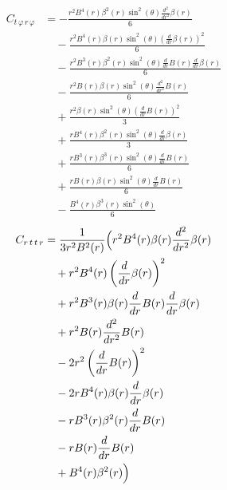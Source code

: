 \documentclass[11pt,a4paper]{article}
\begin{document}
\begin{align*}
  C_{t\,\varphi\,r\,\varphi} &= - \frac{r^{2} B^{4}{\left(r \right)} \beta^{2}{\left(r \right)} \sin^{2}{\left(\theta \right)} \frac{d^{2}}{d r^{2}} \beta{\left(r \right)}}{6} \\
  &\quad - \frac{r^{2} B^{4}{\left(r \right)} \beta{\left(r \right)} \sin^{2}{\left(\theta \right)} \left(\frac{d}{d r} \beta{\left(r \right)}\right)^{2}}{6} \\
  &\quad - \frac{r^{2} B^{3}{\left(r \right)} \beta^{2}{\left(r \right)} \sin^{2}{\left(\theta \right)} \frac{d}{d r} B{\left(r \right)} \frac{d}{d r} \beta{\left(r \right)}}{6} \\
  &\quad - \frac{r^{2} B{\left(r \right)} \beta{\left(r \right)} \sin^{2}{\left(\theta \right)} \frac{d^{2}}{d r^{2}} B{\left(r \right)}}{6} \\
  &\quad + \frac{r^{2} \beta{\left(r \right)} \sin^{2}{\left(\theta \right)} \left(\frac{d}{d r} B{\left(r \right)}\right)^{2}}{3} \\
  &\quad + \frac{r B^{4}{\left(r \right)} \beta^{2}{\left(r \right)} \sin^{2}{\left(\theta \right)} \frac{d}{d r} \beta{\left(r \right)}}{3} \\
  &\quad + \frac{r B^{3}{\left(r \right)} \beta^{3}{\left(r \right)} \sin^{2}{\left(\theta \right)} \frac{d}{d r} B{\left(r \right)}}{6} \\
  &\quad + \frac{r B{\left(r \right)} \beta{\left(r \right)} \sin^{2}{\left(\theta \right)} \frac{d}{d r} B{\left(r \right)}}{6} \\
  &\quad - \frac{B^{4}{\left(r \right)} \beta^{3}{\left(r \right)} \sin^{2}{\left(\theta \right)}}{6}
\end{align*}
\begin{align*}
  C_{r\,t\,t\,r} &= \frac{1}{3 r^{2} B^{2}{\left(r \right)}}\Bigl(r^{2} B^{4}{\left(r \right)} \beta{\left(r \right)} \frac{d^{2}}{d r^{2}} \beta{\left(r \right)} \\
  &\quad + r^{2} B^{4}{\left(r \right)} \left(\frac{d}{d r} \beta{\left(r \right)}\right)^{2} \\
  &\quad + r^{2} B^{3}{\left(r \right)} \beta{\left(r \right)} \frac{d}{d r} B{\left(r \right)} \frac{d}{d r} \beta{\left(r \right)} \\
  &\quad + r^{2} B{\left(r \right)} \frac{d^{2}}{d r^{2}} B{\left(r \right)} \\
  &\quad - 2 r^{2} \left(\frac{d}{d r} B{\left(r \right)}\right)^{2} \\
  &\quad - 2 r B^{4}{\left(r \right)} \beta{\left(r \right)} \frac{d}{d r} \beta{\left(r \right)} \\
  &\quad - r B^{3}{\left(r \right)} \beta^{2}{\left(r \right)} \frac{d}{d r} B{\left(r \right)} \\
  &\quad - r B{\left(r \right)} \frac{d}{d r} B{\left(r \right)} \\
  &\quad + B^{4}{\left(r \right)} \beta^{2}{\left(r \right)}\Bigr)
\end{align*}
\end{document}

